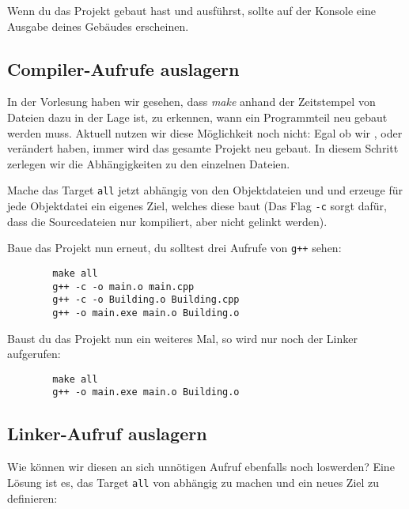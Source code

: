 
Wenn du das Projekt gebaut hast und ausführst, sollte auf der Konsole eine Ausgabe deines Gebäudes erscheinen.

\subsection{Compiler-Aufrufe auslagern}
In der Vorlesung haben wir gesehen, dass \emph{make} anhand der Zeitstempel von Dateien dazu in der Lage ist, zu erkennen, wann ein Programmteil neu gebaut werden muss.
Aktuell nutzen wir diese Möglichkeit noch nicht:
Egal ob wir ,  oder  verändert haben, immer wird das gesamte Projekt neu gebaut.
In diesem Schritt zerlegen wir die Abhängigkeiten zu den einzelnen Dateien.

Mache das Target \texttt{all} jetzt abhängig von den Objektdateien  und  und erzeuge für jede Objektdatei ein eigenes Ziel, welches diese baut (Das Flag \texttt{-c} sorgt dafür, dass die Sourcedateien nur kompiliert, aber nicht gelinkt werden).


Baue das Projekt nun erneut, du solltest drei Aufrufe von \texttt{g++} sehen:

\begin{verbatim}
        make all
        g++ -c -o main.o main.cpp
        g++ -c -o Building.o Building.cpp
        g++ -o main.exe main.o Building.o
\end{verbatim}

Baust du das Projekt nun ein weiteres Mal, so wird nur noch der Linker aufgerufen:
\begin{verbatim}
        make all
        g++ -o main.exe main.o Building.o
\end{verbatim}

\subsection{Linker-Aufruf auslagern}
Wie können wir diesen an sich unnötigen Aufruf ebenfalls noch loswerden?
Eine Lösung ist es, das Target \texttt{all} von  abhängig zu machen und ein neues Ziel  zu definieren:


